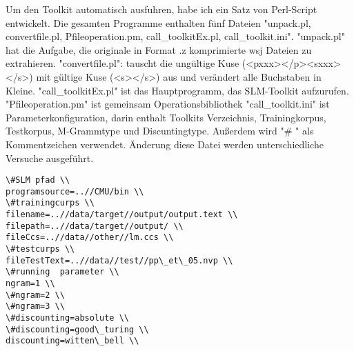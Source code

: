 
Um den Toolkit automatisch ausfuhren, habe ich ein Satz von Perl-Script entwickelt. 
Die gesamten Programme enthalten f\"unf Dateien "unpack.pl, convertfile.pl, Pfileoperation.pm, call\_toolkitEx.pl, call\_toolkit.ini".
"unpack.pl" hat die Aufgabe, die originale in Format .z komprimierte  wsj Dateien zu extrahieren.
"convertfile.pl": tauscht die ung\"ultige Kuse (<pxxx></p><sxxx></s>) mit g\"ultige Kuse (<s></s>) aus und ver\"andert alle Buchstaben in Kleine. 
"call\_toolkitEx.pl" ist das Hauptprogramm, das SLM-Toolkit aufzurufen. 
"Pfileoperation.pm" ist gemeinsam Operationsbibliothek
"call\_toolkit.ini" ist Parameterkonfiguration, darin enthalt Toolkits Verzeichnis, Trainingkorpus, Testkorpus, M-Grammtype und Discuntingtype. Au\ss erdem wird  "\# "  als Kommentzeichen verwendet. \"Anderung diese Datei werden unterschiedliche Versuche ausgef\"uhrt.\\
\begin{lstlisting}
\#SLM pfad \\
programsource=..//CMU/bin \\
\#trainingcurps \\
filename=..//data/target//output/output.text \\
filepath=..//data/target//output/ \\
fileCcs=..//data//other//lm.ccs \\
\#testcurps \\
fileTestText=..//data//test//pp\_et\_05.nvp \\
\#running  parameter \\
ngram=1 \\
\#ngram=2 \\
\#ngram=3 \\
\#discounting=absolute \\
\#discounting=good\_turing \\
discounting=witten\_bell \\

\end{lstlisting}
